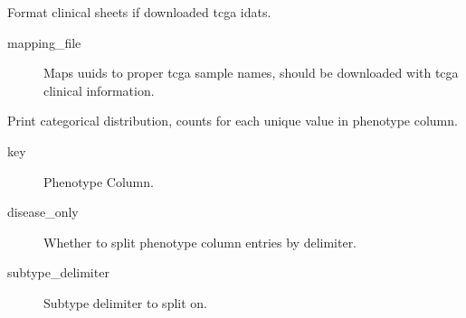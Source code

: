 \documentclass[letterpaper,10pt,english]{sphinxmanual}
\begin{document}
\begin{fulllineitems}
\begin{fulllineitems}
\end{fulllineitems}


\begin{fulllineitems}
\label{\detokenize{index:pymethylprocess.PreProcessDataTypes.PreProcessPhenoData.format_tcga}}
Format clinical sheets if downloaded tcga idats.
\begin{description}
\item[{mapping\_file}] \leavevmode
Maps uuids to proper tcga sample names, should be downloaded with tcga clinical information.

\end{description}

\end{fulllineitems}


\begin{fulllineitems}
\label{\detokenize{index:pymethylprocess.PreProcessDataTypes.PreProcessPhenoData.get_categorical_distribution}}
Print categorical distribution, counts for each unique value in phenotype column.
\begin{description}
\item[{key}] \leavevmode
Phenotype Column.

\item[{disease\_only}] \leavevmode
Whether to split phenotype column entries by delimiter.

\item[{subtype\_delimiter}] \leavevmode
Subtype delimiter to split on.

\end{description}

\end{fulllineitems}



\end{fulllineitems}
\end{document}
